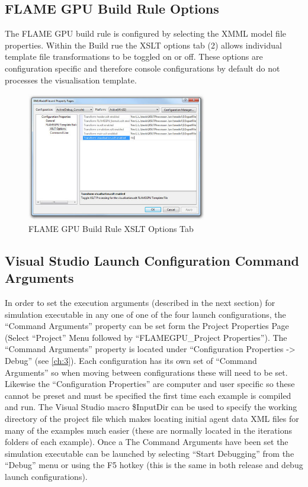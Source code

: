 \documentclass[11pt, a4paper, onecolumn, oneside]{report}
\begin{document}
\subsection{FLAME GPU Build Rule Options}
\label{sec:444}


The FLAME GPU build rule is configured by selecting the XMML model file properties.
Within the Build rue the XSLT options tab (2) allows individual template file transformations to be toggled on or off.
These options are configuration specific and therefore console configurations by default do not processes the visualisation template.

\begin{figure}[ht]
    \centering
    \includegraphics[width=0.70\textwidth]{img/figure2}
    \caption{FLAME GPU Build Rule XSLT Options Tab}
    \label{fig:build-rule-xslt-options-tab}
\end{figure} 

\subsection{Visual Studio Launch Configuration Command Arguments}
\label{sec:445}


In order to set the execution arguments (described in the next section) for simulation executable in any one of one of the four launch configurations, the ``Command Arguments'' property can be set form the Project Properties Page (Select ``Project'' Menu followed by ``FLAMEGPU\_Project Properties'').
The ``Command Arguments'' property is located under ``Configuration Properties -> Debug'' (see \cref{ch:3}).
Each configuration has its own set of ``Command Arguments'' so when moving between configurations these will need to be set.
Likewise the ``Configuration Properties'' are computer and user specific so these cannot be preset and must be specified the first time each example is compiled and run.
The Visual Studio macro \$InputDir can be used to specify the working directory of the project file which makes locating initial agent data XML files for many of the examples much easier (these are normally located in the iterations folders of each example).
Once a 
The Command Arguments have been set the simulation executable can be launched by selecting ``Start Debugging'' from the ``Debug'' menu or using the F5 hotkey (this is the same in both release and debug launch configurations).
\end{document}
